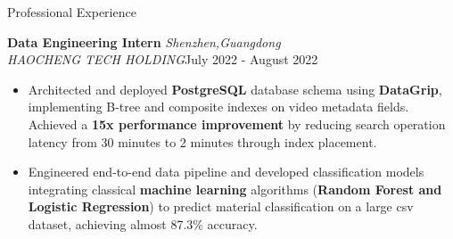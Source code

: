 \begin{rSection}{Professional Experience} 
\vspace{-5pt}  %

{\bf Data Engineering Intern} \hfill \textit{Shenzhen,Guangdong} \\
\textit{HAOCHENG TECH HOLDING}\hfill July 2022 - August 2022
\begin{itemize}
    \setlength{\parskip}{1pt}
    \setlength{\baselineskip}{3pt}
    \vspace{-5pt}  %

   \item Architected and deployed \textbf{PostgreSQL} database schema using \textbf{DataGrip}, implementing B-tree and composite indexes on video metadata fields. Achieved a \textbf{15x performance improvement} by reducing search operation latency from 30 minutes to 2 minutes through  index placement.

    
    \item Engineered end-to-end data pipeline and developed classification models integrating classical \textbf{machine learning} algorithms (\textbf{Random Forest and Logistic Regression}) to predict material classification on a large csv dataset, achieving almost 87.3\% accuracy.
    
   



\end{itemize}



\end{rSection}

